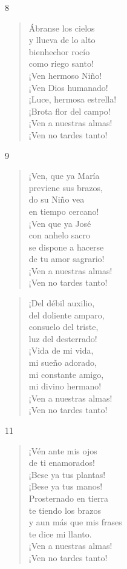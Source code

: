 \documentclass[spanish,utf8,twocolumn]{chlart}
\newenvironment{gozo}{\begin{verse}\color{lector}}{\end{verse}}
\newcommand*\vena{{\color{responden}\hspace{1em}¡Ven a nuestras almas!\\\hspace{1em}¡Ven no tardes tanto!}}
\begin{document}
8
\begin{gozo}
Ábranse los cielos\\
y llueva de lo alto\\
bienhechor rocío\\
como riego santo!\\
¡Ven hermoso Niño!\\
¡Ven Dios humanado!\\
¡Luce, hermosa estrella!\\
¡Brota flor del campo!\\
\vena
\end{gozo}

9
\begin{gozo}
¡Ven, que ya María\\
previene sus brazos,\\
do su Niño vea\\
en tiempo cercano!\\
¡Ven que ya José\\
con anhelo sacro\\
se dispone a hacerse\\
de tu amor sagrario!\\
\vena
\end{gozo}

\begin{gozo}
¡Del débil auxilio,\\
del doliente amparo,\\
consuelo del triste,\\
luz del desterrado!\\
¡Vida de mi vida,\\
mi sueño adorado,\\
mi constante amigo,\\
mi divino hermano!\\
\vena
\end{gozo}

11
\begin{gozo}
¡Vén ante mis ojos\\
de ti enamorados!\\
¡Bese ya tus plantas!\\
¡Bese ya tus manos!\\
Prosternado en tierra\\
te tiendo los brazos\\
y aun más que mis frases\\
te dice mi llanto.\\
\vena
\end{gozo}
\end{document}
